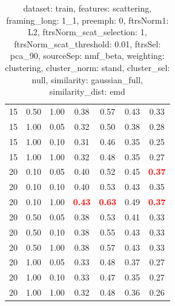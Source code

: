 \documentclass[12pt,a4paper,fleqn]{tufte-handout}
\begin{document}
\begin{table}
\begin{center}
\begin{tabular}{lllcccc}
15 & 0.50 & 1.00 & 0.38 & 0.57 & 0.43 & 0.33 \\         
15 & 1.00 & 0.05 & 0.32 & 0.50 & 0.38 & 0.28 \\         
15 & 1.00 & 0.10 & 0.31 & 0.46 & 0.35 & 0.25 \\         
15 & 1.00 & 1.00 & 0.32 & 0.48 & 0.35 & 0.27 \\         
20 & 0.10 & 0.05 & 0.40 & 0.52 & 0.45 & \textbf{\textcolor{red}{0.37}} \\         
20 & 0.10 & 0.10 & 0.40 & 0.53 & 0.43 & 0.35 \\         
20 & 0.10 & 1.00 & \textbf{\textcolor{red}{0.43}} & \textbf{\textcolor{red}{0.63}} & 0.49 & \textbf{\textcolor{red}{0.37}} \\         
20 & 0.50 & 0.05 & 0.38 & 0.53 & 0.41 & 0.33 \\         
20 & 0.50 & 0.10 & 0.38 & 0.55 & 0.43 & 0.33 \\         
20 & 0.50 & 1.00 & 0.38 & 0.57 & 0.43 & 0.33 \\         
20 & 1.00 & 0.05 & 0.33 & 0.48 & 0.37 & 0.27 \\         
20 & 1.00 & 0.10 & 0.33 & 0.47 & 0.35 & 0.27 \\         
20 & 1.00 & 1.00 & 0.32 & 0.48 & 0.36 & 0.26 \\         
\end{tabular}         
\end{center}         
\caption{dataset: train, features: scattering, framing\_long: 1\_1, preemph: 0, ftrsNorm1: L2, ftrsNorm\_scat\_selection: 1, ftrsNorm\_scat\_threshold: 0.01, ftrsSel: pca\_90, sourceSep: nmf\_beta, weighting: clustering, cluster\_norm: stand, cluster\_sel: null, similarity: gaussian\_full, similarity\_dist: emd}         
\label{datasetrFeaturscFraminlong1_1Preemp0Ftrsnorm1L2Ftrsnoscatselect1Ftrsnoscatthresh0.01Ftrsselpc90SourcesepnmbeWeightclClustenormstClusteselnuSimilagafuSimiladistem}         
\end{table}         
 
\end{document}
